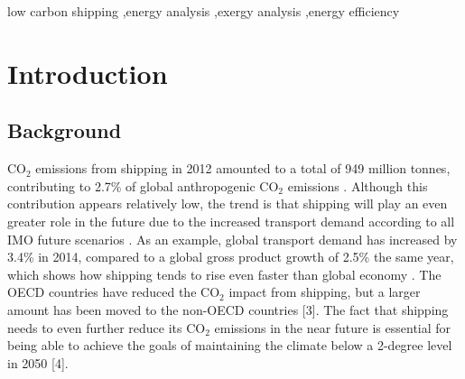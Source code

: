\documentclass[preprint,12pt]{elsarticle}
\begin{document}
\begin{frontmatter}
\begin{keyword}



low carbon shipping \sep energy analysis \sep exergy analysis \sep energy efficiency

\end{keyword}

\end{frontmatter}







\printnomenclature %

\section{Introduction} \label{sec:introduction}

\subsection{Background}

CO$_2$ emissions from shipping in 2012 amounted to a total of 949 million tonnes, contributing to 2.7\% of global anthropogenic CO$_2$ emissions \cite{Smith2014}. Although this contribution appears relatively low, the trend is that shipping will play an even greater role in the future due to the increased transport demand according to all IMO future scenarios \cite{Smith2014}. As an example, global transport demand has increased by 3.4\% in 2014, compared to a global gross product growth of 2.5\% the same year, which shows how shipping tends to rise even faster than global economy \cite{UNCTAD2015}. The OECD countries have reduced the CO$_2$ impact from shipping, but a larger amount has been moved to the non-OECD countries [3]. The fact that shipping needs to even further reduce its CO$_2$ emissions in the near future is essential for being able to achieve the goals of maintaining the climate below a 2-degree level in 2050 [4]. 
\end{document}
